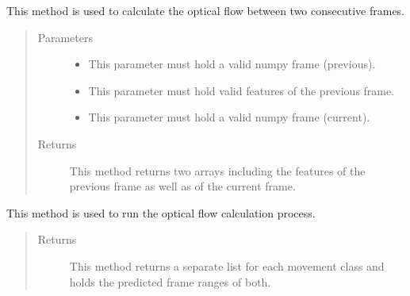 \documentclass[letterpaper,10pt,english,openany,oneside]{sphinxmanual}
\begin{document}
\begin{fulllineitems}
\begin{fulllineitems}
\end{fulllineitems}


\begin{fulllineitems}
\label{\detokenize{OpticalFlow:cmc.OpticalFlow.OpticalFlow.optical_flow}}
This method is used to calculate the optical flow between two consecutive frames.
\begin{quote}\begin{description}
\item[{Parameters}] \leavevmode\begin{itemize}
\item {} 
 \textendash{} This parameter must hold a valid numpy frame (previous).

\item {} 
 \textendash{} This parameter must hold valid features of the previous frame.

\item {} 
 \textendash{} This parameter must hold a valid numpy frame (current).

\end{itemize}

\item[{Returns}] \leavevmode
This method returns two arrays including the features of the previous frame as well as of the current frame.

\end{description}\end{quote}

\end{fulllineitems}


\begin{fulllineitems}
\label{\detokenize{OpticalFlow:cmc.OpticalFlow.OpticalFlow.run}}
This method is used to run the optical flow calculation process.
\begin{quote}\begin{description}
\item[{Returns}] \leavevmode
This method returns a separate list for each movement class and holds the predicted frame ranges of both.


\end{description}
\end{quote}
\end{fulllineitems}
\end{fulllineitems}
\end{document}
